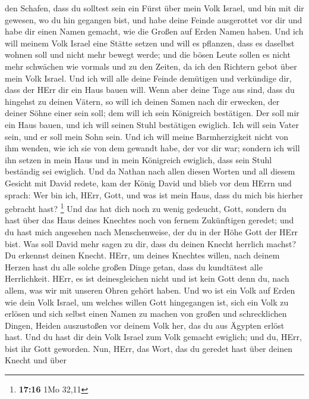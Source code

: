 den Schafen, dass du solltest sein ein Fürst über mein Volk Israel,
 und bin mit dir gewesen, wo du hin gegangen bist, und habe
deine Feinde ausgerottet vor dir und habe dir einen Namen gemacht, wie
die Großen auf Erden Namen haben.  Und ich will meinem Volk
Israel eine Stätte setzen und will es pflanzen, dass es daselbst wohnen
soll und nicht mehr bewegt werde; und die bösen Leute sollen es nicht
mehr schwächen wie vormals und zu den Zeiten, da ich den Richtern gebot
über mein Volk Israel.  Und ich will alle deine Feinde
demütigen und verkündige dir, dass der HErr dir ein Haus bauen will.
 Wenn aber deine Tage aus sind, dass du hingehst zu deinen
Vätern, so will ich deinen Samen nach dir erwecken, der deiner Söhne
einer sein soll; dem will ich sein Königreich bestätigen. 
Der soll mir ein Haus bauen, und ich will seinen Stuhl bestätigen
ewiglich.  Ich will sein Vater sein, und er soll mein Sohn
sein. Und ich will meine Barmherzigkeit nicht von ihm wenden, wie ich
sie von dem gewandt habe, der vor dir war;  sondern ich
will ihn setzen in mein Haus und in mein Königreich ewiglich, dass sein
Stuhl beständig sei ewiglich.  Und da Nathan nach allen
diesen Worten und all diesem Gesicht mit David redete,  kam
der König David und blieb vor dem HErrn und sprach: Wer bin ich, HErr,
Gott, und was ist mein Haus, dass du mich bis hierher gebracht hast?
\footnote{\textbf{17:16} 1Mo 32,11}  Und das hat dich noch
zu wenig gedeucht, Gott, sondern du hast über das Haus deines Knechtes
noch von fernem Zukünftigen geredet; und du hast mich angesehen nach
Menschenweise, der du in der Höhe Gott der HErr bist.  Was
soll David mehr sagen zu dir, dass du deinen Knecht herrlich machst? Du
erkennst deinen Knecht.  HErr, um deines Knechtes willen,
nach deinem Herzen hast du alle solche großen Dinge getan, dass du
kundtätest alle Herrlichkeit.  HErr, es ist deinesgleichen
nicht und ist kein Gott denn du, nach allem, was wir mit unseren Ohren
gehört haben.  Und wo ist ein Volk auf Erden wie dein Volk
Israel, um welches willen Gott hingegangen ist, sich ein Volk zu erlösen
und sich selbst einen Namen zu machen von großen und schrecklichen
Dingen, Heiden auszustoßen vor deinem Volk her, das du aus Ägypten
erlöst hast.  Und du hast dir dein Volk Israel zum Volk
gemacht ewiglich; und du, HErr, bist ihr Gott geworden. 
Nun, HErr, das Wort, das du geredet hast über deinen Knecht und über
